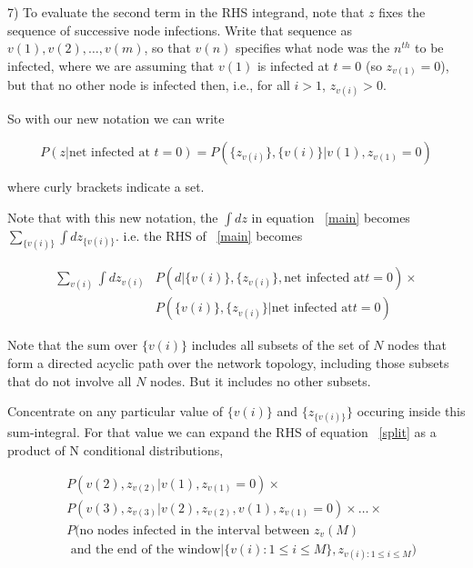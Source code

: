 \documentclass{article}
\begin{document}
        7) To evaluate the second term in the RHS integrand, note that $z$ fixes
	the sequence of successive node infections. Write that sequence as
	$v(1), v(2), \ldots, v(m)$, so that $v(n)$ specifies what node was the 
        $n^{th}$ to be infected, where we are assuming that $v(1)$ is infected 
        at $t = 0$ (so $z_{v(1)} = 0$), but that no other node is infected then, 
        i.e., for all  $i > 1$, $z_{v(i)} > 0$.

	So with our new notation we can write

\begin{equation}
P(z | \text{net infected at } t = 0) = P(\{z_{v(i)}\}, \{v(i)\} | v(1), z_{v(1)} = 0)
\label{split}
\end{equation}
	
        where curly brackets indicate a set. 

	Note that with this new notation, the  $\int dz$ in equation ~\eqref{main} 
        becomes $ \sum_{\{v(i)\}} \int dz_{\{v(i)\}}$.  i.e. the RHS of ~\eqref{main} 
        becomes

\begin{align}
\sum_{v(i)} \int dz_{v(i)} & P(d | 
\{v(i)\}, \{z_{v(i)}\}, \text{net infected at} t  = 0)    \times \\
& P(\{v(i)\}, \{z_{v(i)}\} | \text{net infected at} t=0)
\end{align}

        Note that the sum over $\{v(i)\}$ includes all subsets of the set of $N$
        nodes that form a directed acyclic path over the network topology,
        including those subsets that do not involve all $N$ nodes. But it
        includes no other subsets.

	Concentrate on any particular value of $\{v(i)\}$ and $\{z_{\{v(i)\}}\}$ 
        occuring inside this sum-integral. For that value we can expand the RHS of 
        equation ~\eqref{split} as a product of N conditional distributions,

\begin{align}
& P(v(2), z_{v(2)} |  v(1), z_{v(1)} = 0)    \times  \\
& P(v(3), z_{v(3)} |  v(2), z_{v(2)}, v(1), z_{v(1)} = 0) \times  \ldots  \times \\
& P(\text{no nodes infected in the interval between } z_v(M) \\
&\text{ and the end of the window}  |  \{v(i) : 1 \le i \le M\}, z_{v(i) : 1 \le i \le M})
\end{align}
\end{document}
